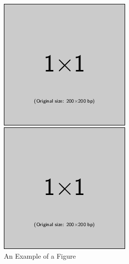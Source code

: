 \documentclass{article}
\begin{document}
\begin{figure}[t]
\begin{minipage}{.45\hsize}
   \end{minipage}
   \\\vspace{1em}
   \begin{minipage}{.45\hsize}
      \centering
      \includegraphics[width=.8\hsize]{figure/example-image-png.png}%
   \end{minipage}
   \begin{minipage}{.45\hsize}
      \centering
      \includegraphics[width=.8\hsize]{figure/example-image-png.png}%
   \end{minipage}
   \caption{An Example of a Figure}
\end{figure}
\end{document}
